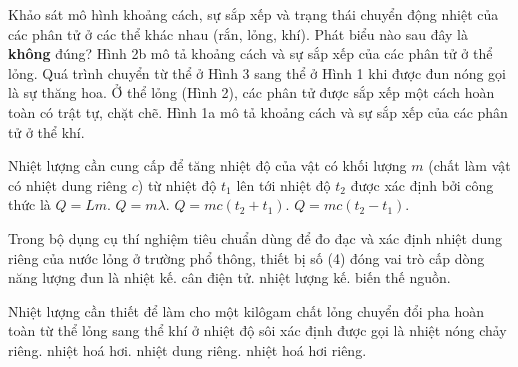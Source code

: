 \begin{ex}	Khảo sát mô hình khoảng cách, sự sắp xếp và trạng thái chuyển động nhiệt của các phân tử ở các thể khác nhau (rắn, lỏng, khí). Phát biểu nào sau đây là \textbf{không} đúng?
	\choice
	{Hình 2b mô tả khoảng cách và sự sắp xếp của các phân tử ở thể lỏng.}
	{Quá trình chuyển từ thể ở Hình 3 sang thể ở Hình 1 khi được đun nóng gọi là sự thăng hoa.}
	{\True Ở thể lỏng (Hình 2), các phân tử được sắp xếp một cách hoàn toàn có trật tự, chặt chẽ.}
	{Hình 1a mô tả khoảng cách và sự sắp xếp của các phân tử ở thể khí.}
\end{ex}

\begin{ex}	Nhiệt lượng cần cung cấp để tăng nhiệt độ của vật có khối lượng $m$ (chất làm vật có nhiệt dung riêng $c$) từ nhiệt độ $t_1$ lên tới nhiệt độ $t_2$ được xác định bởi công thức là
	\choice
	{$Q=Lm$.}
	{$Q=m\lambda$.}
	{$Q=mc(t_2+t_1)$.}
	{\True $Q=mc(t_2-t_1)$.}
\end{ex}

\begin{ex}	Trong bộ dụng cụ thí nghiệm tiêu chuẩn dùng để đo đạc và xác định nhiệt dung riêng của nước lỏng ở trường phổ thông, thiết bị số (4) đóng vai trò cấp dòng năng lượng đun là
	\choice
	{nhiệt kế.}
	{cân điện tử.}
	{nhiệt lượng kế.}
	{\True biến thế nguồn.}
\end{ex}

\begin{ex}	Nhiệt lượng cần thiết để làm cho một kilôgam chất lỏng chuyển đổi pha hoàn toàn từ thể lỏng sang thể khí ở nhiệt độ sôi xác định được gọi là
	\choice
	{nhiệt nóng chảy riêng.}
	{nhiệt hoá hơi.}
	{nhiệt dung riêng.}
	{\True nhiệt hoá hơi riêng.}
\end{ex}

